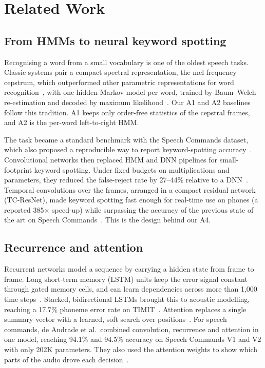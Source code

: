 \section{Related Work}
\label{sec:related}

\subsection{From HMMs to neural keyword spotting}
Recognising a word from a small vocabulary is one of the oldest speech tasks. Classic systems pair a compact
spectral representation, the mel-frequency cepstrum, which outperformed other parametric representations for
word recognition~\cite{davis1980comparison}, with one hidden Markov model per word, trained by Baum--Welch
re-estimation and decoded by maximum likelihood~\cite{rabiner1989tutorial}. Our A1 and A2 baselines follow this
tradition. A1 keeps only order-free statistics of the cepstral frames, and A2 is the per-word left-to-right HMM.

The task became a standard benchmark with the Speech Commands dataset, which also proposed a reproducible way to
report keyword-spotting accuracy~\cite{warden2018speech}. Convolutional networks then replaced HMM and DNN
pipelines for small-footprint keyword spotting. Under fixed budgets on multiplications and parameters, they
reduced the false-reject rate by 27--44\% relative to a DNN~\cite{sainath2015convolutional}. Temporal
convolutions over the frames, arranged in a compact residual network (TC-ResNet), made keyword spotting fast
enough for real-time use on phones (a reported 385$\times$ speed-up) while surpassing the accuracy of the previous
state of the art on Speech Commands~\cite{choi2019temporal}. This is the design behind our A4.

\subsection{Recurrence and attention}
Recurrent networks model a sequence by carrying a hidden state from frame to frame. Long short-term memory (LSTM)
units keep the error signal constant through gated memory cells, and can learn dependencies across more than
1{,}000 time steps~\cite{hochreiter1997long}. Stacked, bidirectional LSTMs brought this to acoustic modelling,
reaching a 17.7\% phoneme error rate on TIMIT~\cite{graves2013speech}. Attention replaces a single summary
vector with a learned, soft search over positions~\cite{bahdanau2015neural}. For speech commands, de Andrade et
al.\ combined convolution, recurrence and attention in one model, reaching 94.1\% and 94.5\% accuracy on Speech
Commands V1 and V2 with only 202K parameters. They also used the attention weights to show which parts of the
audio drove each decision~\cite{deandrade2018neural}.

